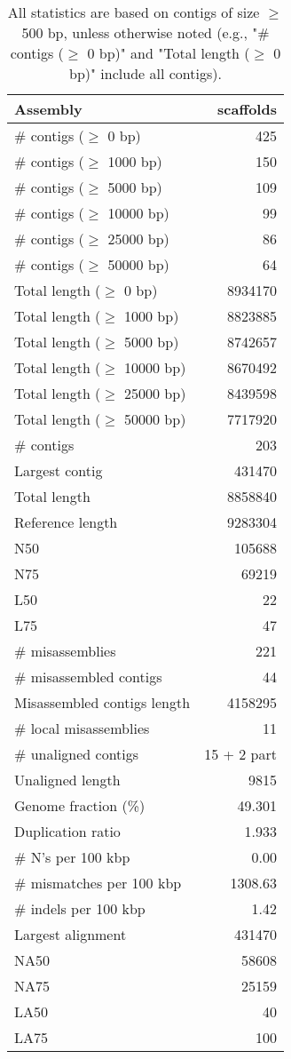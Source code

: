 \documentclass[12pt,a4paper]{article}
\begin{document}
\begin{table}[ht]
\begin{center}
\caption{All statistics are based on contigs of size $\geq$ 500 bp, unless otherwise noted (e.g., "\# contigs ($\geq$ 0 bp)" and "Total length ($\geq$ 0 bp)" include all contigs).}
\begin{tabular}{|l*{1}{|r}|}
\hline
Assembly & scaffolds \\ \hline
\# contigs ($\geq$ 0 bp) & 425 \\ \hline
\# contigs ($\geq$ 1000 bp) & 150 \\ \hline
\# contigs ($\geq$ 5000 bp) & 109 \\ \hline
\# contigs ($\geq$ 10000 bp) & 99 \\ \hline
\# contigs ($\geq$ 25000 bp) & 86 \\ \hline
\# contigs ($\geq$ 50000 bp) & 64 \\ \hline
Total length ($\geq$ 0 bp) & 8934170 \\ \hline
Total length ($\geq$ 1000 bp) & 8823885 \\ \hline
Total length ($\geq$ 5000 bp) & 8742657 \\ \hline
Total length ($\geq$ 10000 bp) & 8670492 \\ \hline
Total length ($\geq$ 25000 bp) & 8439598 \\ \hline
Total length ($\geq$ 50000 bp) & 7717920 \\ \hline
\# contigs & 203 \\ \hline
Largest contig & 431470 \\ \hline
Total length & 8858840 \\ \hline
Reference length & 9283304 \\ \hline
N50 & 105688 \\ \hline
N75 & 69219 \\ \hline
L50 & 22 \\ \hline
L75 & 47 \\ \hline
\# misassemblies & 221 \\ \hline
\# misassembled contigs & 44 \\ \hline
Misassembled contigs length & 4158295 \\ \hline
\# local misassemblies & 11 \\ \hline
\# unaligned contigs & 15 + 2 part \\ \hline
Unaligned length & 9815 \\ \hline
Genome fraction (\%) & 49.301 \\ \hline
Duplication ratio & 1.933 \\ \hline
\# N's per 100 kbp & 0.00 \\ \hline
\# mismatches per 100 kbp & 1308.63 \\ \hline
\# indels per 100 kbp & 1.42 \\ \hline
Largest alignment & 431470 \\ \hline
NA50 & 58608 \\ \hline
NA75 & 25159 \\ \hline
LA50 & 40 \\ \hline
LA75 & 100 \\ \hline
\end{tabular}
\end{center}
\end{table}
\end{document}
